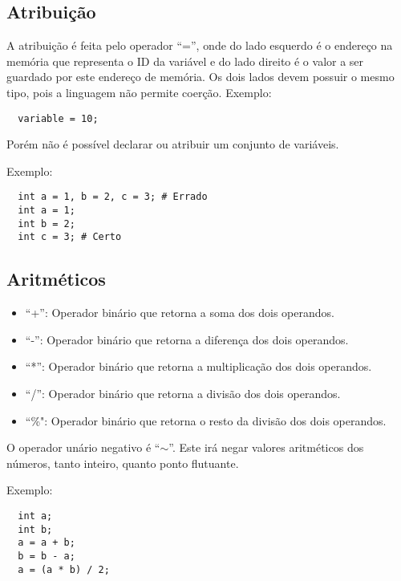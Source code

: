 \documentclass[a4paper, 11pt, article]{memoir}
\begin{document}
\subsection{Atribuição}
\label{subsec:atribuicao}
A atribuição é feita pelo operador ``='', onde do lado esquerdo é o endereço na
memória que representa o ID da variável e do lado direito é o valor a ser
guardado por este endereço de memória. Os dois lados devem possuir o mesmo tipo,
pois a linguagem não permite coerção.
Exemplo:
\begin{lstlisting}
  variable = 10;
\end{lstlisting}
Porém não é possível declarar ou atribuir um conjunto de variáveis.

Exemplo:
\begin{lstlisting}
  int a = 1, b = 2, c = 3; # Errado
  int a = 1;
  int b = 2;
  int c = 3; # Certo
\end{lstlisting}

\subsection{Aritméticos}
\label{subsec:aritmeticos}
\begin{itemize}
\item ``+'': Operador binário que retorna a soma dos dois operandos.
\item ``-'': Operador binário que retorna a diferença dos dois operandos.
\item ``*'': Operador binário que retorna a multiplicação dos dois operandos.
\item ``/'': Operador binário que retorna a divisão dos dois operandos.
\item ``\%": Operador binário que retorna o resto da divisão dos dois operandos.
\end{itemize}

O operador unário negativo é ``$\sim$''. Este irá negar valores aritméticos dos
números, tanto inteiro, quanto ponto flutuante.

Exemplo:
\begin{lstlisting}
  int a;
  int b;
  a = a + b;
  b = b - a;
  a = (a * b) / 2;
\end{lstlisting}
\end{document}
